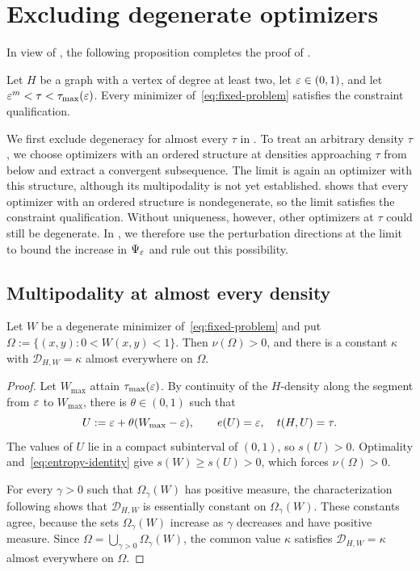 \section{Excluding degenerate optimizers}\label{sec:degenerate-optimizers}

In view of , the following
proposition completes the proof of .

\begin{prop}\label{prop:optimizer-nondegeneracy}
Let $H$ be a graph with a vertex of degree at least two, let $\varepsilon\in(0,1)$,
and let $\varepsilon^m<\tau<\tau_{\max}(\varepsilon)$. Every minimizer
of~\eqref{eq:fixed-problem} satisfies the constraint qualification.
\end{prop}

We first exclude degeneracy for almost every $\tau$ in
. To treat an arbitrary density $\tau$,
we choose optimizers with an ordered structure at densities approaching
$\tau$ from below and extract a convergent subsequence. The limit is
again an optimizer with this structure, although its multipodality is
not yet established.  shows that every
optimizer with an ordered structure is nondegenerate, so the limit satisfies the
constraint qualification. Without uniqueness, however, other optimizers
at $\tau$ could still be degenerate. In
, we therefore use the perturbation
directions at the limit to bound the increase in $\Psi_\varepsilon$ and rule out
this possibility.

\subsection{Multipodality at almost every density}\label{sec:almost-every-multipodality}

\begin{lemma}\label{lem:degenerate-forms}
Let $W$ be a degenerate minimizer of~\eqref{eq:fixed-problem} and put
$\Omega:=\{(x,y):0<W(x,y)<1\}$.  Then $\nu(\Omega)>0$, and there is a constant $\kappa$
with $\mathcal D_{H,W}=\kappa$ almost everywhere on $\Omega$.
\end{lemma}

\begin{proof}
Let $W_{\max}$ attain $\tau_{\max}(\varepsilon)$.  By continuity of the
$H$-density along the segment from $\varepsilon$ to $W_{\max}$, there is
$\theta\in(0,1)$ such that
\[
  U:=\varepsilon+\theta(W_{\max}-\varepsilon),
  \qquad e(U)=\varepsilon,\quad t(H,U)=\tau.
\]
The values of $U$ lie in a compact subinterval of $(0,1)$,
so $s(U)>0$.
Optimality and~\eqref{eq:entropy-identity} give $s(W)\ge s(U)>0$, which
forces $\nu(\Omega)>0$.

For every $\gamma>0$ such that $\Omega_\gamma(W)$ has positive measure, the
characterization following  shows
that $\mathcal D_{H,W}$ is essentially constant on $\Omega_\gamma(W)$.  These
constants agree, because the sets $\Omega_\gamma(W)$ increase as $\gamma$
decreases and have positive measure.  Since
$\Omega=\bigcup_{\gamma>0}\Omega_\gamma(W)$, the common value $\kappa$ satisfies
$\mathcal D_{H,W}=\kappa$ almost everywhere on $\Omega$.
\end{proof}

